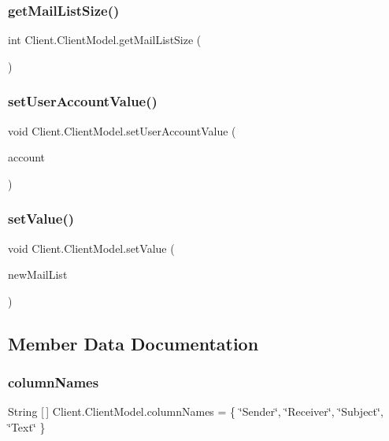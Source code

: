 \subsubsection{get\+Mail\+List\+Size()}
{\footnotesize\ttfamily int Client.\+Client\+Model.\+get\+Mail\+List\+Size (\begin{DoxyParamCaption}{ }\end{DoxyParamCaption})}

\mbox{\label{class_client_1_1_client_model_a417b22b272dfe3a83370ba8eeb445fe6}} 
\subsubsection{set\+User\+Account\+Value()}
{\footnotesize\ttfamily void Client.\+Client\+Model.\+set\+User\+Account\+Value (\begin{DoxyParamCaption}\item[{String}]{account }\end{DoxyParamCaption})}

\mbox{\label{class_client_1_1_client_model_a13b1b7845bc73c20779a15c3ad6df326}} 
\subsubsection{set\+Value()}
{\footnotesize\ttfamily void Client.\+Client\+Model.\+set\+Value (\begin{DoxyParamCaption}\item[{Array\+List$<$ \textbf{ Email} $>$}]{new\+Mail\+List }\end{DoxyParamCaption})}



\subsection{Member Data Documentation}
\mbox{\label{class_client_1_1_client_model_aa90e219d31df9bd5296f596d03a02be9}} 
\subsubsection{column\+Names}
{\footnotesize\ttfamily String [$\,$] Client.\+Client\+Model.\+column\+Names = \{ \char`\"{}Sender\char`\"{}, \char`\"{}Receiver\char`\"{}, \char`\"{}Subject\char`\"{}, \char`\"{}Text\char`\"{} \}\hspace{0.3cm}{\ttfamily [package]}}


